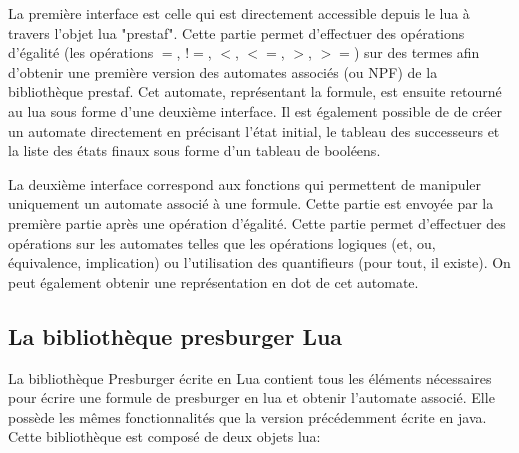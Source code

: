 La première interface est celle qui est directement accessible depuis le lua à travers l’objet lua "prestaf". Cette partie permet d’effectuer des opérations d’égalité (les opérations $=$, $!=$, $<$, $<=$, $>$, $>=$) sur des termes afin d’obtenir une première version des automates associés (ou NPF) de la bibliothèque prestaf. Cet automate, représentant la formule, est ensuite retourné au lua sous forme d’une deuxième interface. Il est également possible de de créer un automate directement en précisant l’état initial, le tableau des successeurs et la liste des états finaux sous forme d’un tableau de booléens.\\\par

La deuxième interface correspond aux fonctions qui permettent de manipuler uniquement un automate associé à une formule. Cette partie est envoyée par la première partie après une opération d’égalité. Cette partie permet d’effectuer des opérations sur les automates telles que les opérations logiques (et, ou, équivalence, implication) ou l’utilisation des quantifieurs (pour tout, il existe). On peut également obtenir une représentation en dot de cet automate.

\subsection{La bibliothèque presburger Lua}

La bibliothèque Presburger écrite en Lua contient tous les éléments nécessaires pour écrire une formule de presburger en lua et obtenir l’automate associé. Elle possède les mêmes fonctionnalités que la version précédemment écrite en java. Cette bibliothèque est composé de deux objets lua:

